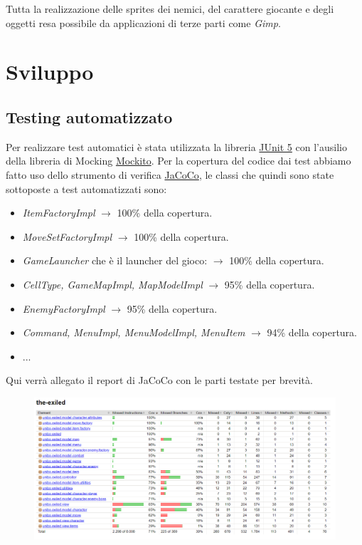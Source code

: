 \documentclass[a4paper,12pt]{report}
\begin{document}
Tutta la realizzazione delle sprites dei nemici, del carattere giocante e degli oggetti resa possibile da applicazioni di terze parti come \textit{Gimp}.

\chapter{Sviluppo}

\section{Testing automatizzato}
Per realizzare test automatici è stata utilizzata la libreria \href{https://junit.org/junit5/}{JUnit 5} con l'ausilio della libreria di Mocking \href{https://github.com/mockito/mockito}{Mockito}. Per la copertura del codice dai test abbiamo fatto uso dello strumento di verifica \href{https://www.eclemma.org/jacoco/}{JaCoCo}, le classi che quindi sono state sottoposte a test automatizzati sono:

\begin{itemize}
	\item \textit{ItemFactoryImpl} $\longrightarrow$ 100\% della copertura.
	\item \textit{MoveSetFactoryImpl} $\longrightarrow$ 100\% della copertura.
	\item \textit{GameLauncher} che è il launcher del gioco: $\longrightarrow$ 100\% della copertura.
	\item \textit{CellType, GameMapImpl, MapModelImpl} $\longrightarrow$ 95\% della copertura.
	\item \textit{EnemyFactoryImpl} $\longrightarrow$ 95\% della copertura.
	\item \textit{Command, MenuImpl, MenuModelImpl, MenuItem} $\longrightarrow$ 94\% della copertura.
	\item ...
\end{itemize}

Qui verrà allegato il report di JaCoCo con le parti testate per brevità.

\begin{figure}[H]
	\centering
	\includegraphics[scale=0.45]{jacoco-report.png}
\end{figure}
\end{document}
